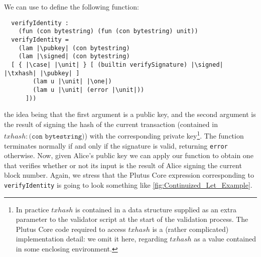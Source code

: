 \documentclass[../plutus-core-specification.tex]{subfiles}
\begin{document}
\noindent We can use \case{} to define the following function:
\begin{lstlisting}
  verifyIdentity :
    (fun (con bytestring) (fun (con bytestring) unit))
  verifyIdentity =
    (lam |\pubkey| (con bytestring)
    (lam |\signed| (con bytestring)
  [ { |\case| |\unit| } [ (builtin verifySignature) |\signed| |\txhash| |\pubkey| ]
        (lam u |\unit| |\one|)
        (lam u |\unit| (error |\unit|))
      ]))
\end{lstlisting}
the idea being that the first argument is a public key, and the second
argument is the result of signing the hash of the current transaction
(contained in $\mathit{txhash} : \texttt{(con bytestring)}$) with
the corresponding private key\footnote{In practice $\mathit{txhash}$
  is contained in a data structure supplied as an extra parameter to
  the validator script at the start of the validation process.  The
  Plutus Core code required to access $\mathit{txhash}$ is a (rather
  complicated) implementation detail: we omit it here, regarding
  $\mathit{txhash}$ as a value contained in some enclosing
  environment.}.  The function terminates normally if and only if the
signature is valid, returning \texttt{error} otherwise. Now, given
Alice's public key we can apply our function to obtain one that
verifies whether or not its input is the result of Alice signing the
current block number. Again, we stress that the Plutus Core expression
corresponding to \texttt{verifyIdentity} is going to look something
like \cref{fig:Continuized_Let_Example}.



\end{document}
